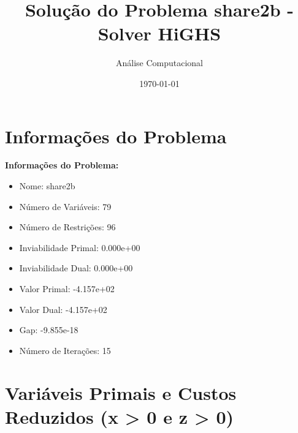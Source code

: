 \documentclass[12pt]{article}
\title{Solução do Problema share2b - Solver HiGHS}
\author{Análise Computacional}
\date{\today}
\begin{document}
\maketitle

\section{Informações do Problema}

\textbf{Informações do Problema:}
\begin{itemize}
\item Nome: share2b
\item Número de Variáveis: 79
\item Número de Restrições: 96
\item Inviabilidade Primal: 0.000e+00
\item Inviabilidade Dual: 0.000e+00
\item Valor Primal: -4.157e+02
\item Valor Dual: -4.157e+02
\item Gap: -9.855e-18
\item Número de Iterações: 15
\end{itemize}


\section{Variáveis Primais e Custos Reduzidos (x > 0 e z > 0)}
\end{document}
